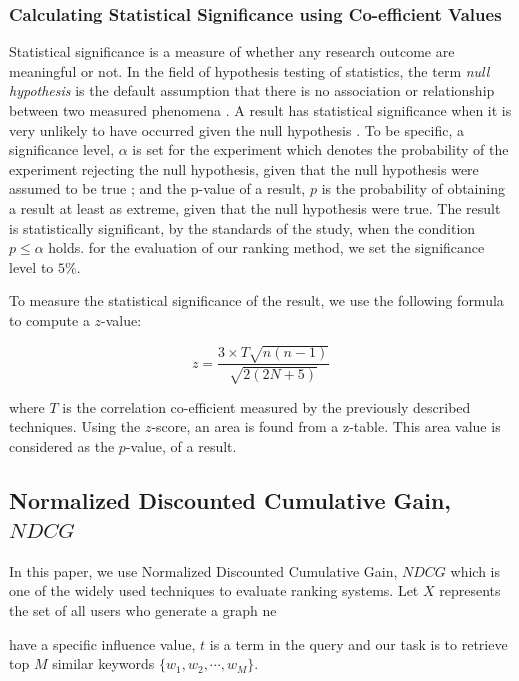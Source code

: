 \documentclass[sigconf]{acmart}
\begin{document}
\subsubsection{Calculating Statistical Significance using Co-efficient Values}
Statistical significance is a measure of whether any research outcome are meaningful or not. In the field of hypothesis testing of statistics, the term \textit{null hypothesis} is the default assumption that there is no association or relationship between two measured phenomena \cite{DictionaryofStatistics}. A result has statistical significance when it is very unlikely to have occurred given the null hypothesis \cite{myers2010developing}. To be specific, a significance level, $\alpha$ is set for the experiment which denotes the probability of the experiment rejecting the null hypothesis, given that the null hypothesis were assumed to be true \cite{dalgaard2011}; and the p-value of a result, $p$ is the probability of obtaining a result at least as extreme, given that the null hypothesis were true. The result is statistically significant, by the standards of the study, when the condition $p \leq \alpha$ holds\cite{johnson2013revised,redmond2001biostatistics,cumming2013understanding,krzywinski2013points,devore2011probability}.
for the evaluation of our ranking method, we set the significance level to $5\%$.

To measure the statistical significance of the result, we use the following formula to compute a $z$-value:

\begin{equation}
z = \dfrac{3 \times T \sqrt{n(n-1)}}{\sqrt{2(2N+5)}}
\end{equation}

where $T$ is the correlation co-efficient measured by the previously described techniques. Using the $z$-score, an area is found from a z-table. This area value is considered as the $p$-value,  of a result.


\subsection{Normalized Discounted Cumulative Gain, $NDCG$}
In this paper, we use Normalized Discounted Cumulative Gain, $NDCG$ which is one of the widely used techniques to evaluate ranking systems. Let $X$ represents the set of all users who generate a graph ne

have a specific influence value, $t$ is a term in the query and our task is to retrieve top $M$ similar keywords $\{w_1, w_2, \cdots, w_M\}$. 
\end{document}
